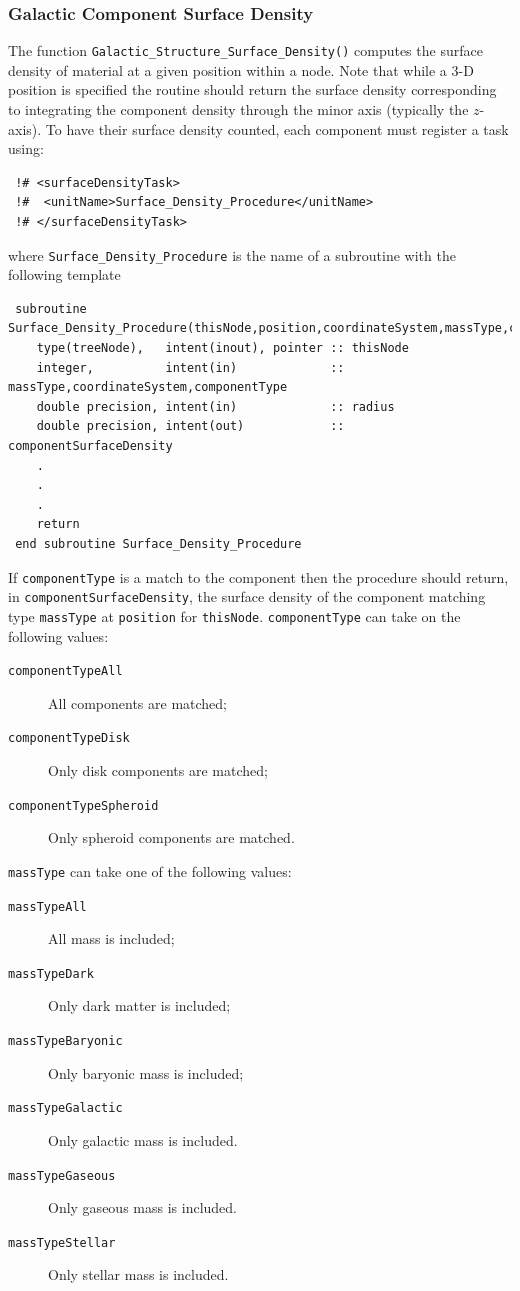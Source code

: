 \subsubsection{Galactic Component Surface Density}

The function {\tt Galactic\_Structure\_Surface\_Density()} computes the surface density of material at a given position within a node. Note that while a 3-D position is specified the routine should return the surface density corresponding to integrating the component density through the minor axis (typically the $z$-axis). To have their surface density counted, each component must register a task using:
\begin{verbatim}
 !# <surfaceDensityTask>
 !#  <unitName>Surface_Density_Procedure</unitName>
 !# </surfaceDensityTask>
\end{verbatim}
where {\tt Surface\_Density\_Procedure} is the name of a subroutine with the following template
\begin{verbatim}
 subroutine Surface_Density_Procedure(thisNode,position,coordinateSystem,massType,componentType,componentSurfaceDensity)
    type(treeNode),   intent(inout), pointer :: thisNode
    integer,          intent(in)             :: massType,coordinateSystem,componentType
    double precision, intent(in)             :: radius
    double precision, intent(out)            :: componentSurfaceDensity
    .
    .
    .
    return
 end subroutine Surface_Density_Procedure
\end{verbatim}
If {\tt componentType} is a match to the component then the procedure should return, in {\tt componentSurfaceDensity}, the surface density of the component matching type {\tt massType} at {\tt position} for {\tt thisNode}. {\tt componentType} can take on the following values:
\begin{description}
 \item [{\tt componentTypeAll}] All components are matched;
 \item [{\tt componentTypeDisk}] Only disk components are matched;
 \item [{\tt componentTypeSpheroid}] Only spheroid components are matched.
\end{description}
{\tt massType} can take one of the following values:
\begin{description}
 \item [{\tt massTypeAll}] All mass is included;
 \item [{\tt massTypeDark}] Only dark matter is included;
 \item [{\tt massTypeBaryonic}] Only baryonic mass is included;
 \item [{\tt massTypeGalactic}] Only galactic mass is included.
 \item [{\tt massTypeGaseous}] Only gaseous mass is included.
 \item [{\tt massTypeStellar}] Only stellar mass is included.
\end{description}
